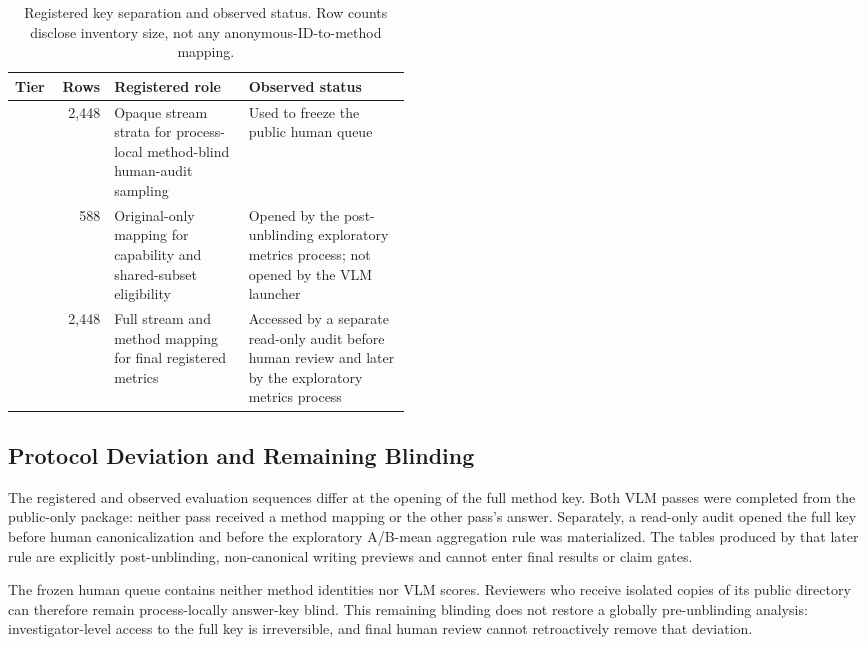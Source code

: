 \begin{table}[H]
  \centering
  \caption{Registered key separation and observed status.  Row counts disclose
  inventory size, not any anonymous-ID-to-method mapping.}
  \label{tab:key-separation}
  \small
  \setlength{\tabcolsep}{4pt}
  \begin{tabularx}{\linewidth}{@{}>{\raggedright\arraybackslash}p{0.12\linewidth}r>{\raggedright\arraybackslash}p{0.34\linewidth}>{\raggedright\arraybackslash}X@{}}
    \toprule
    Tier & Rows & Registered role & Observed status \\
    \midrule
    0 & 2,448
      & Opaque stream strata for process-local method-blind human-audit sampling
      & Used to freeze the public human queue \\
    1 & 588
      & Original-only mapping for capability and shared-subset eligibility
      & Opened by the post-unblinding exploratory metrics process; not opened by the VLM launcher \\
    2 & 2,448
      & Full stream and method mapping for final registered metrics
      & Accessed by a separate read-only audit before human review and later by the exploratory metrics process \\
    \bottomrule
  \end{tabularx}
\end{table}

\subsection{Protocol Deviation and Remaining Blinding}
\label{app:evaluation-deviations}

The registered and observed evaluation sequences differ at the opening of the
full method key.  Both VLM passes were completed from the public-only package:
neither pass received a method mapping or the other pass's answer.  Separately,
a read-only audit opened the full key before human
canonicalization and before the exploratory A/B-mean aggregation rule was
materialized.  The tables produced by that later rule are explicitly
post-unblinding, non-canonical writing previews and cannot enter final results
or claim gates.

The frozen human queue contains neither method identities nor VLM scores.
Reviewers who receive isolated copies of its public directory can therefore
remain process-locally answer-key blind.  This remaining blinding does not
restore a globally pre-unblinding analysis: investigator-level access to the
full key is irreversible, and final human review cannot retroactively remove
that deviation.

